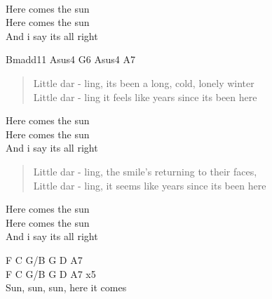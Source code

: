 \begin{song}[title={Here Comes The Sun Chords},interpret={George Harrison}]
\begin{intro}
                          \\
\begin{chorus}
  Here comes the sun\\
  Here comes the sun\\
And i say  its all    right\\
\end{chorus}

Bmadd11 Asus4 G6 Asus4 A7\\
\begin{verse}
 Little dar - ling, its been a long, cold, lonely winter  \\
 Little dar - ling it feels like years since its been here  \\
\end{verse}

\begin{chorus}
  Here comes the sun\\
  Here comes the sun\\
And i say  its all    right\\
\end{chorus}

\begin{verse}
 Little dar - ling, the smile's returning to their faces,  \\
 Little dar - ling, it seems like years since its been here  \\
\end{verse}

\begin{chorus}
  Here comes the sun\\
  Here comes the sun\\
And i say  its all    right\\
\end{chorus}

\begin{bridge}
F C G/B G D A7\\
F C G/B G D A7 x5\\
Sun, sun, sun, here it comes\\
\end{bridge}


\end{intro}
\end{song}

